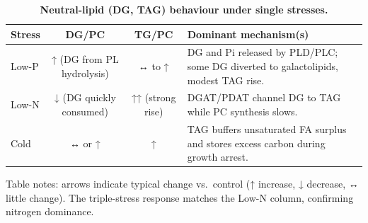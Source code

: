 \documentclass[10pt,letterpaper]{article}
\begin{document}
\begin{table}[!ht]
  \begin{adjustwidth}{-2.25in}{0in} %
    \centering
    \caption{{\bf Neutral-lipid (DG, TAG) behaviour under single stresses.}}
    \begin{tabular}{|l|c|c|p{4in}|}
      \hline
      \textbf{Stress} & \textbf{DG/PC} & \textbf{TG/PC} &
      \textbf{Dominant mechanism(s)} \\ \hline
      Low-P  & ↑ (DG from PL hydrolysis) & ↔ to ↑ &
      DG and Pi released by PLD/PLC; some DG diverted to galactolipids,
      modest TAG rise. \\ \hline
      Low-N  & ↓ (DG quickly consumed) & ↑↑ (strong rise) &
      DGAT/PDAT channel DG to TAG while PC synthesis slows. \\ \hline
      Cold   & ↔ or ↑ & ↑ &
      TAG buffers unsaturated FA surplus and stores excess carbon
      during growth arrest. \\ \hline
    \end{tabular}
    \begin{flushleft}
      Table notes: arrows indicate typical change vs.\ control
      (↑ increase, ↓ decrease, ↔ little change).  The triple-stress
      response matches the Low-N column, confirming nitrogen dominance.
    \end{flushleft}
    \label{table:neutral_stress_single}
  \end{adjustwidth}
\end{table}
\end{document}
